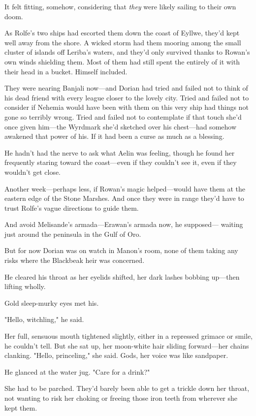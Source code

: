 It felt fitting, somehow, considering that \emph{they} were likely sailing to their own doom.

As Rolfe's two ships had escorted them down the coast of Eyllwe, they'd kept well away from the shore. A wicked storm had them mooring among the small cluster of islands off Leriba's waters, and they'd only survived thanks to Rowan's own winds shielding them. Most of them had still spent the entirely of it with their head in a bucket. Himself included.

They were nearing Banjali now---and Dorian had tried and failed not to think of his dead friend with every league closer to the lovely city. Tried and failed not to consider if Nehemia would have been with them on this very ship had things not gone so terribly wrong. Tried and failed not to contemplate if that touch she'd once given him---the Wyrdmark she'd sketched over his chest---had somehow  awakened that power of his. If it had been a curse as much as a blessing.

He hadn't had the nerve to ask what Aelin was feeling, though he found her frequently staring toward the coast---even if they couldn't see it, even if they wouldn't get close.

Another week---perhaps less, if Rowan's magic helped---would have them at the eastern edge of the Stone Marshes. And once they were in range
 they'd have to trust Rolfe's vague directions to guide them.

And avoid Melisande's armada---Erawan's armada now, he supposed--- waiting just around the peninsula in the Gulf of Oro.

But for now  Dorian was on watch in Manon's room, none of them taking any risks where the Blackbeak heir was concerned.

He cleared his throat as her eyelids shifted, her dark lashes bobbing up---then lifting wholly.

Gold sleep-murky eyes met his.

"Hello, witchling," he said.

Her full, sensuous mouth tightened slightly, either in a repressed grimace or smile, he couldn't tell. But she sat up, her moon-white hair sliding forward---her chains clanking. "Hello, princeling," she said. Gods, her voice was like sandpaper.

He glanced at the water jug. "Care for a drink?"

She had to be parched. They'd barely been able to get a trickle down her throat, not wanting to risk her choking or freeing those iron teeth from wherever she kept them.

